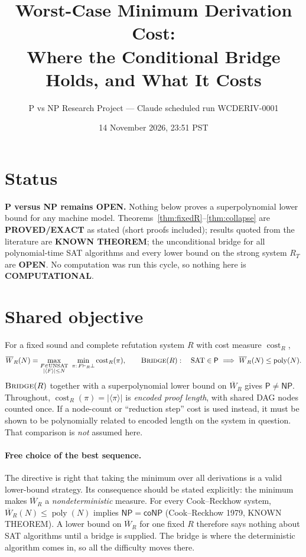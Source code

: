 \documentclass[11pt]{article}
\title{Worst-Case Minimum Derivation Cost:\\
Where the Conditional Bridge Holds, and What It Costs}
\author{P vs NP Research Project --- Claude scheduled run WCDERIV-0001}
\date{14 November 2026, 23:51 PST}
\newcommand{\Pclass}{\mathsf P}
\newcommand{\NP}{\mathsf{NP}}
\newcommand{\coNP}{\mathsf{coNP}}
\newcommand{\SAT}{\mathrm{SAT}}
\newcommand{\UNSAT}{\mathrm{UNSAT}}
\newcommand{\poly}{\operatorname{poly}}
\newcommand{\cost}{\operatorname{cost}}
\newcommand{\Wbar}{\overline W}
\begin{document}
\maketitle

\section*{Status}
\textbf{P versus NP remains OPEN.} Nothing below proves a superpolynomial
lower bound for any machine model. Theorems~\ref{thm:fixedR}--\ref{thm:collapse}
are \textbf{PROVED/EXACT} as stated (short proofs included); results quoted from
the literature are \textbf{KNOWN THEOREM}; the unconditional bridge for all
polynomial-time SAT algorithms and every lower bound on the strong system
$R_T$ are \textbf{OPEN}. No computation was run this cycle, so nothing here is
\textbf{COMPUTATIONAL}.

\section*{Shared objective}
For a fixed sound and complete refutation system $R$ with cost measure $\cost_R$,
\[
\Wbar_R(N)=\max_{\substack{F\in\UNSAT\\ |\langle F\rangle|\le N}}
\ \min_{\pi:\,F\vdash_R\bot}\cost_R(\pi),
\qquad
\textsc{Bridge}(R):\quad \SAT\in\Pclass\ \Longrightarrow\ \Wbar_R(N)\le\poly(N).
\]
$\textsc{Bridge}(R)$ together with a superpolynomial lower bound on $\Wbar_R$
gives $\Pclass\ne\NP$. Throughout, $\cost_R(\pi)=|\langle\pi\rangle|$ is
\emph{encoded proof length}, with shared DAG nodes counted once. If a node-count
or ``reduction step'' cost is used instead, it must be shown to be polynomially
related to encoded length on the system in question. That comparison is
\emph{not} assumed here.

\paragraph{Free choice of the best sequence.}
The directive is right that taking the minimum over all derivations is a valid
lower-bound strategy. Its consequence should be stated explicitly: the minimum
makes $\Wbar_R$ a \emph{nondeterministic} measure. For every Cook--Reckhow
system, $\Wbar_R(N)\le\poly(N)$ implies $\NP=\coNP$
(Cook--Reckhow 1979, KNOWN THEOREM). A lower bound on $\Wbar_R$ for one fixed $R$
therefore says nothing about SAT algorithms until a bridge is supplied. The
bridge is where the deterministic algorithm comes in, so all the difficulty
moves there.
\end{document}

